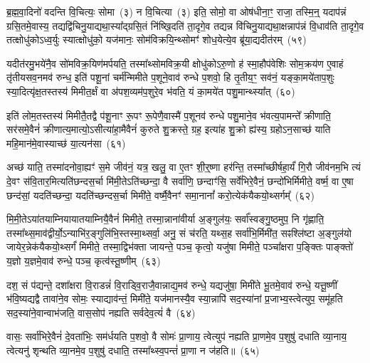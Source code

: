 {\anuvakamend[{म॒हि॒मान॒ꣴ॒ स्वाहाप॑हत्या अध्व॒र्युर्धी॑यते॒ चतु॑र्विꣳशतिश्च}]}%

ब्र॒ह्म॒वा॒दिनो॑ वदन्ति वि॒चित्यः॒ सोमा~(३) न वि॒चित्या~(३) इति॒ सोमो॒ वा ओष॑धीना॒ꣳ॒ राजा॒ तस्मि॒न्॒ यदाप॑न्नं ग्रसि॒तमे॒वास्य॒ तद्यद्वि॑चिनु॒याद्यथा॒स्या᳚द्ग्रसि॒तं नि॑ष्खि॒दति॑ ता॒दृगे॒व तद्यन्न वि॑चिनु॒याद्यथा॒क्षन्नाप॑न्नं वि॒धाव॑ति ता॒दृगे॒व तत्क्षोधु॑को\-ऽध्व॒र्युः स्यात्क्षोधु॑को॒ यज॑मानः॒ सोम॑विक्रयि॒न्थ्सोमꣳ॑ शोध॒येत्ये॒व ब्रू॑या॒द्यदीत॑रम्~(५९)

यदीत॑रमु॒भये॑नै॒व सो॑मविक्र॒यिण॑मर्पयति॒ तस्मा᳚थ्सोमविक्र॒यी क्षोधु॑को\-ऽरु॒णो ह॑ स्मा॒हौप॑वेशिः सोम॒क्रय॑ण ए॒वाहं तृ॑तीयसव॒नमव॑ रुन्ध॒ इति॑ पशू॒नां चर्म॑न्मिमीते प॒शूने॒वाव॑ रुन्धे प॒शवो॒ हि तृ॒तीय॒ꣳ॒ सव॑नं॒ यङ्का॒मये॑ताप॒शुः स्या॒दित्यृ॑क्ष॒तस्तस्य॑ मिमीत॒र्क्षं वा अ॑पश॒व्यम॑प॒शुरे॒व भ॑वति॒ यं का॒मये॑त पशु॒मान्थ्स्या᳚त्~(६०)

इति॑ लोम॒तस्तस्य॑ मिमीतै॒तद्वै प॑शू॒नाꣳ रू॒पꣳ रू॒पेणै॒वास्मै॑ प॒शूनव॑ रुन्धे पशु॒माने॒व भ॑वत्य॒पामन्ते᳚ क्रीणाति॒ सर॑समे॒वैनं॑ क्रीणात्य॒मात्यो॒\-ऽसीत्या॑हा॒मैवैनं॑ कुरुते शु॒क्रस्ते॒ ग्रह॒ इत्या॑ह शु॒क्रो ह्य॑स्य॒ ग्रहो\-ऽन॒साच्छ॑ याति महि॒मान॑मे॒वास्याच्छ॑ या॒त्यन॑सा~(६१)

अच्छ॑ याति॒ तस्मा॑दनोवा॒ह्यꣳ॑ स॒मे जीव॑नं॒ यत्र॒ खलु॒ वा ए॒तꣳ शी॒र्॒\mbox{}ष्णा हर॑न्ति॒ तस्मा᳚च्छीर्\mbox{}षहा॒र्यं॑ गि॒रौ जीव॑नम॒भि त्यं दे॒वꣳ स॑वि॒तार॒मित्यति॑छन्दस॒र्चा मि॑मी॒ते\-ऽति॑च्छन्दा॒ वै सर्वा॑णि॒ छन्दाꣳ॑सि॒ सर्वे॑भिरे॒वैनं॒ छन्दो॑भिर्मिमीते॒ वर्\mbox{}ष्म॒ वा ए॒षा छन्द॑सां॒ यदति॑च्छन्दा॒ यदति॑च्छन्दस॒र्चा मिमी॑ते॒ वर्\mbox{}ष्मै॒वैनꣳ॑ समा॒नानां᳚ करो॒त्येक॑यैकयो॒थ्सर्गम्᳚~(६२)

मि॒मी॒ते\-ऽया॑तयाम्नियायातयाम्नियै॒वैनं॑ मिमीते॒ तस्मा॒न्नाना॑वीर्या अ॒ङ्गुल॑यः॒ सर्वा᳚स्वङ्गु॒ष्ठमुप॒ नि गृ॑ह्णाति॒ तस्मा᳚थ्स॒माव॑द्वीर्यो॒\-ऽन्याभि॑र॒ङ्गुलि॑भि॒स्तस्मा॒थ्सर्वा॒ अनु॒ सं च॑रति॒ यथ्स॒ह सर्वा॑भि॒र्मिमी॑त॒ सꣴश्लि॑ष्टा अ॒ङ्गुल॑यो जायेर॒न्नेक॑यैकयो॒थ्सर्गं॑ मिमीते॒ तस्मा॒द्विभ॑क्ता जायन्ते॒ पञ्च॒ कृत्वो॒ यजु॑षा मिमीते॒ पञ्चा᳚क्षरा प॒ङ्क्तिः पाङ्क्तो॑ य॒ज्ञो य॒ज्ञमे॒वाव॑ रुन्धे॒ पञ्च॒ कृत्व॑स्तू॒ष्णीम्~(६३)

दश॒ सं प॑द्यन्ते॒ दशा᳚क्षरा वि॒राडन्नं॑ वि॒राड्वि॒राजै॒वान्नाद्य॒मव॑ रुन्धे॒ यद्यजु॑षा॒ मिमी॑ते भू॒तमे॒वाव॑ रुन्धे॒ यत्तू॒ष्णीं भ॑वि॒ष्यद्यद्वै तावा॑ने॒व सोमः॒ स्याद्याव॑न्तं॒ मिमी॑ते॒ यज॑मानस्यै॒व स्या॒न्नापि॑ सद॒स्या॑नां प्र॒जाभ्य॒स्त्वेत्युप॒ समू॑हति सद॒स्या॑ने॒वान्वाभ॑जति॒ वास॒सोप॑ नह्यति सर्वदेव॒त्यं॑ वै~(६४)

वासः॒ सर्वा॑भिरे॒वैनं॑ दे॒वता॑भिः॒ सम॑र्धयति प॒शवो॒ वै सोमः॑ प्रा॒णाय॒ त्वेत्युप॑ नह्यति प्रा॒णमे॒व प॒शुषु॑ दधाति व्या॒नाय॒ त्वेत्यनु॑ शृन्थति व्या॒नमे॒व प॒शुषु॑ दधाति॒ तस्मा᳚थ्स्व॒पन्तं॑ प्रा॒णा न ज॑हति॥~(६५)

